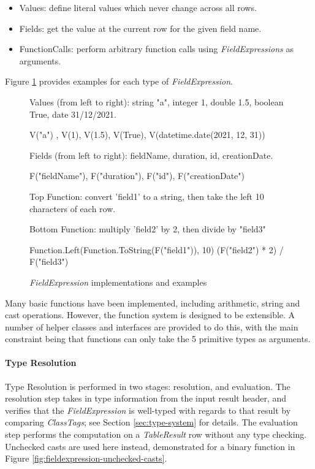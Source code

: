\begin{itemize}
	\item Values: define literal values which never change across all rows.
	\item Fields: get the value at the current row for the given field name.
	\item FunctionCalls: perform arbitrary function calls using \textit{FieldExpressions} as arguments.
\end{itemize}

Figure \ref{fig:field-expressions-examples} provides examples for each type of \textit{FieldExpression}.
\begin{figure}[htp]
	Values (from left to right): string "a", integer 1, double 1.5, boolean True, date 31/12/2021.
	\begin{python}
V("a") , V(1), V(1.5), V(True), V(datetime.date(2021, 12, 31))
	\end{python}

	Fields (from left to right): fieldName, duration, id, creationDate.
	\begin{python}
F("fieldName"), F("duration"), F("id"), F("creationDate")
	\end{python}

	Top Function: convert 'field1' to a string, then take the left 10 characters of each row.
	
	Bottom Function: multiply 'field2' by 2, then divide by "field3"
	\begin{python}
Function.Left(Function.ToString(F("field1")), 10)
(F("field2") * 2) / F("field3")
	\end{python}
	\caption{\textit{FieldExpression} implementations and examples}
	\label{fig:field-expressions-examples}
\end{figure}

Many basic functions have been implemented, including arithmetic, string and cast operations. However, the function system is designed to be extensible. A number of helper classes and interfaces are provided to do this, with the main constraint being that functions can only take the 5 primitive types as arguments.

\paragraph{Type Resolution} 
Type Resolution is performed in two stages: resolution, and evaluation. The resolution step takes in type information from the input result header, and verifies that the \textit{FieldExpression} is well-typed with regards to that result by comparing \textit{ClassTags}; see Section \ref{sec:type-system} for details. The evaluation step performs the computation on a \textit{TableResult} row without any type checking. Unchecked casts are used here instead, demonstrated for a binary function in Figure \ref{fig:fieldexpression-unchecked-casts}. 

